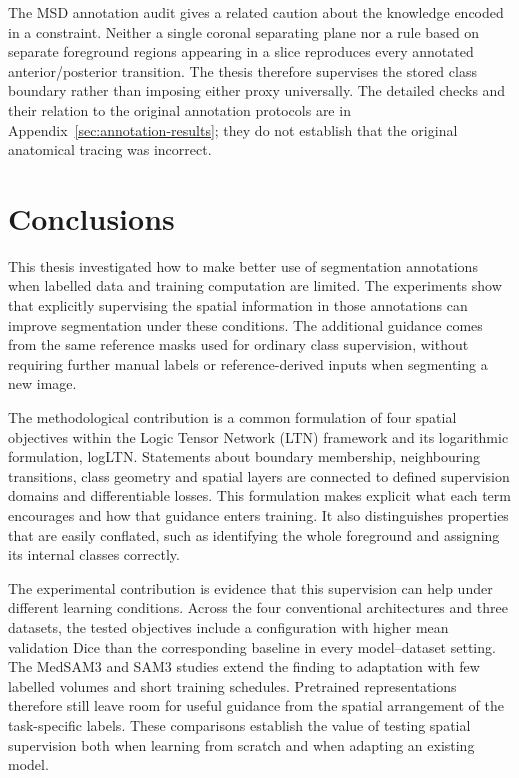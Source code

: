 \documentclass[12pt,a4paper]{article}
\begin{document}
The MSD annotation audit gives a related caution about the knowledge encoded
in a constraint. Neither a single coronal separating plane nor a rule based
on separate foreground regions appearing in a slice reproduces every
annotated anterior/posterior transition. The thesis therefore supervises the
stored class boundary rather than imposing either proxy universally. The
detailed checks and their relation to the original annotation protocols are
in Appendix~\ref{sec:annotation-results}; they do not establish that the
original anatomical tracing was incorrect.

\clearpage

\section{Conclusions}\label{sec:conclusions}

This thesis investigated how to make better use of segmentation
annotations when labelled data and training computation are limited.
The experiments show that explicitly supervising the spatial information
in those annotations can improve segmentation under these conditions.
The additional guidance comes from the same reference masks used for
ordinary class supervision, without requiring further manual labels or
reference-derived inputs when segmenting a new image.

The methodological contribution is a common formulation of four spatial
objectives within the Logic Tensor Network (LTN) framework and its
logarithmic formulation, logLTN. Statements about boundary membership,
neighbouring transitions, class geometry and spatial layers are connected
to defined supervision domains and differentiable losses. This
formulation makes explicit what each term encourages and how that
guidance enters training. It also distinguishes properties that are
easily conflated, such as identifying the whole foreground and assigning
its internal classes correctly.

The experimental contribution is evidence that this supervision can help
under different learning conditions. Across the four conventional
architectures and three datasets, the tested objectives include a
configuration with higher mean validation Dice than the corresponding
baseline in every model--dataset setting. The MedSAM3 and SAM3 studies
extend the finding to adaptation with few labelled volumes and short
training schedules. Pretrained representations therefore still leave
room for useful guidance from the spatial arrangement of the
task-specific labels. These comparisons establish the value of testing
spatial supervision both when learning from scratch and when adapting an
existing model.
\end{document}
